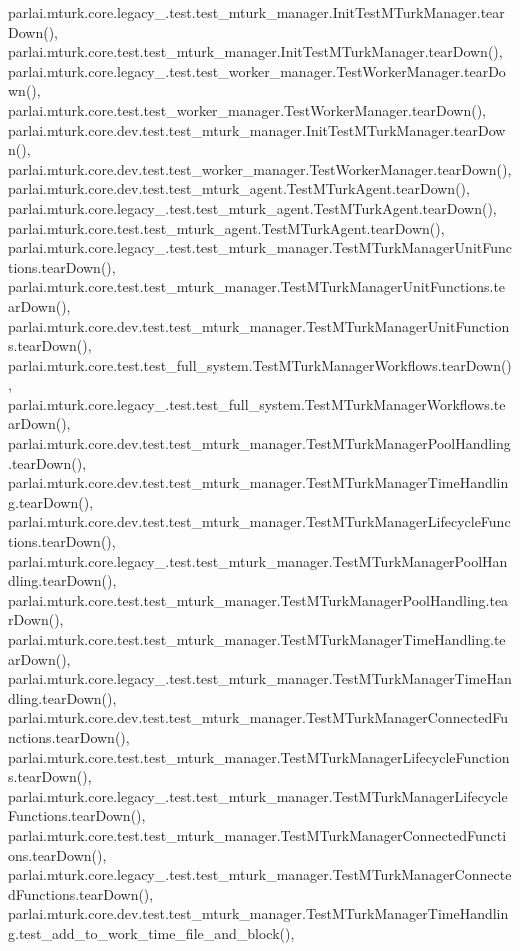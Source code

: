 parlai.\+mturk.\+core.\+legacy\+\_.\+test.\+test\+\_\+mturk\+\_\+manager.\+Init\+Test\+M\+Turk\+Manager.\+tear\+Down(), parlai.\+mturk.\+core.\+test.\+test\+\_\+mturk\+\_\+manager.\+Init\+Test\+M\+Turk\+Manager.\+tear\+Down(), parlai.\+mturk.\+core.\+legacy\+\_.\+test.\+test\+\_\+worker\+\_\+manager.\+Test\+Worker\+Manager.\+tear\+Down(), parlai.\+mturk.\+core.\+test.\+test\+\_\+worker\+\_\+manager.\+Test\+Worker\+Manager.\+tear\+Down(), parlai.\+mturk.\+core.\+dev.\+test.\+test\+\_\+mturk\+\_\+manager.\+Init\+Test\+M\+Turk\+Manager.\+tear\+Down(), parlai.\+mturk.\+core.\+dev.\+test.\+test\+\_\+worker\+\_\+manager.\+Test\+Worker\+Manager.\+tear\+Down(), parlai.\+mturk.\+core.\+dev.\+test.\+test\+\_\+mturk\+\_\+agent.\+Test\+M\+Turk\+Agent.\+tear\+Down(), parlai.\+mturk.\+core.\+legacy\+\_.\+test.\+test\+\_\+mturk\+\_\+agent.\+Test\+M\+Turk\+Agent.\+tear\+Down(), parlai.\+mturk.\+core.\+test.\+test\+\_\+mturk\+\_\+agent.\+Test\+M\+Turk\+Agent.\+tear\+Down(), parlai.\+mturk.\+core.\+legacy\+\_.\+test.\+test\+\_\+mturk\+\_\+manager.\+Test\+M\+Turk\+Manager\+Unit\+Functions.\+tear\+Down(), parlai.\+mturk.\+core.\+test.\+test\+\_\+mturk\+\_\+manager.\+Test\+M\+Turk\+Manager\+Unit\+Functions.\+tear\+Down(), parlai.\+mturk.\+core.\+dev.\+test.\+test\+\_\+mturk\+\_\+manager.\+Test\+M\+Turk\+Manager\+Unit\+Functions.\+tear\+Down(), parlai.\+mturk.\+core.\+test.\+test\+\_\+full\+\_\+system.\+Test\+M\+Turk\+Manager\+Workflows.\+tear\+Down(), parlai.\+mturk.\+core.\+legacy\+\_.\+test.\+test\+\_\+full\+\_\+system.\+Test\+M\+Turk\+Manager\+Workflows.\+tear\+Down(), parlai.\+mturk.\+core.\+dev.\+test.\+test\+\_\+mturk\+\_\+manager.\+Test\+M\+Turk\+Manager\+Pool\+Handling.\+tear\+Down(), parlai.\+mturk.\+core.\+dev.\+test.\+test\+\_\+mturk\+\_\+manager.\+Test\+M\+Turk\+Manager\+Time\+Handling.\+tear\+Down(), parlai.\+mturk.\+core.\+dev.\+test.\+test\+\_\+mturk\+\_\+manager.\+Test\+M\+Turk\+Manager\+Lifecycle\+Functions.\+tear\+Down(), parlai.\+mturk.\+core.\+legacy\+\_.\+test.\+test\+\_\+mturk\+\_\+manager.\+Test\+M\+Turk\+Manager\+Pool\+Handling.\+tear\+Down(), parlai.\+mturk.\+core.\+test.\+test\+\_\+mturk\+\_\+manager.\+Test\+M\+Turk\+Manager\+Pool\+Handling.\+tear\+Down(), parlai.\+mturk.\+core.\+test.\+test\+\_\+mturk\+\_\+manager.\+Test\+M\+Turk\+Manager\+Time\+Handling.\+tear\+Down(), parlai.\+mturk.\+core.\+legacy\+\_.\+test.\+test\+\_\+mturk\+\_\+manager.\+Test\+M\+Turk\+Manager\+Time\+Handling.\+tear\+Down(), parlai.\+mturk.\+core.\+dev.\+test.\+test\+\_\+mturk\+\_\+manager.\+Test\+M\+Turk\+Manager\+Connected\+Functions.\+tear\+Down(), parlai.\+mturk.\+core.\+test.\+test\+\_\+mturk\+\_\+manager.\+Test\+M\+Turk\+Manager\+Lifecycle\+Functions.\+tear\+Down(), parlai.\+mturk.\+core.\+legacy\+\_.\+test.\+test\+\_\+mturk\+\_\+manager.\+Test\+M\+Turk\+Manager\+Lifecycle\+Functions.\+tear\+Down(), parlai.\+mturk.\+core.\+test.\+test\+\_\+mturk\+\_\+manager.\+Test\+M\+Turk\+Manager\+Connected\+Functions.\+tear\+Down(), parlai.\+mturk.\+core.\+legacy\+\_.\+test.\+test\+\_\+mturk\+\_\+manager.\+Test\+M\+Turk\+Manager\+Connected\+Functions.\+tear\+Down(), parlai.\+mturk.\+core.\+dev.\+test.\+test\+\_\+mturk\+\_\+manager.\+Test\+M\+Turk\+Manager\+Time\+Handling.\+test\+\_\+add\+\_\+to\+\_\+work\+\_\+time\+\_\+file\+\_\+and\+\_\+block(), 